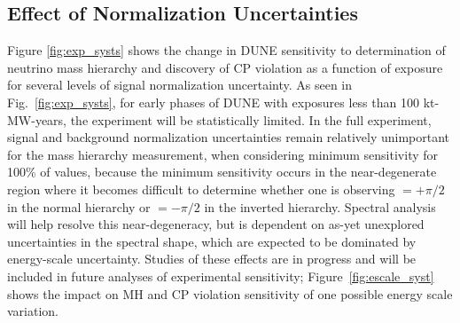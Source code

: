 \subsection{Effect of Normalization Uncertainties}
Figure \ref{fig:exp_systs} shows the
change in DUNE sensitivity to determination of
neutrino mass hierarchy and discovery of CP violation
as a function of exposure for several levels of signal normalization uncertainty.
As seen in Fig.~\ref{fig:exp_systs}, for early phases of DUNE
with exposures less than 100 kt-MW-years, the experiment
will be statistically limited. In the full experiment, signal and
background normalization uncertainties remain
relatively unimportant for the mass hierarchy measurement, when considering
minimum sensitivity for 100\% of \deltacp values, because the minimum sensitivity 
occurs in the near-degenerate region where it becomes difficult to determine
whether one is observing \deltacp $= + \pi/2 $ in the normal hierarchy
or \deltacp $=-\pi/2$ in the inverted hierarchy. Spectral analysis will
help resolve this near-degeneracy, but is dependent on as-yet
unexplored uncertainties in the spectral shape, which are expected to be dominated
by energy-scale uncertainty. Studies of these effects are in progress and will be included in
future analyses of experimental sensitivity; Figure~\ref{fig:escale_syst} shows the
impact on MH and CP violation sensitivity of one possible energy scale variation.
